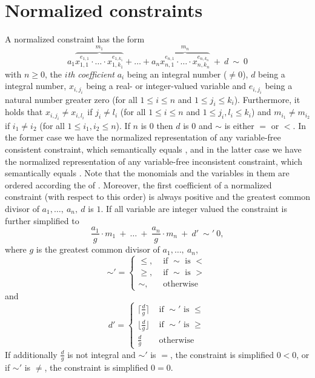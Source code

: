 \section{Normalized constraints}
A normalized constraint has the form
\[a_1\overbrace{x_{1,1}^{e_{1,1}}\cdot\ldots\cdot x_{1,k_1}^{e_{1,k_1}}}^{m_1}+\ldots+a_n\overbrace{x_{n,1}^{e_{n,1}}\cdot\ldots\cdot x_{n,k_n}^{e_{n,k_n}}}^{m_n}\ + \ d\ \sim \ 0\]
with $n\geq0$, the \emph{$i$th coefficient} $a_i$ being an integral number ($\neq 0$), $d$ being a integral number, $x_{i,j_i}$ being a real- or integer-valued variable and $e_{i,j_i}$ being a natural number greater zero (for all $1\leq i\leq n$ and $1\leq j_i\leq k_i$). Furthermore, it holds that
$x_{i,j_i}\neq x_{i,l_i}$ if $j_i\neq l_i$ (for all $1\leq i\leq n$ and $1\leq j_i, l_i\leq k_i$) and $m_{i_1}\neq m_{i_2}$ if $i_1\neq i_2$ (for all $1\leq i_1,i_2\leq n$). If $n$ is $0$ then $d$ is $0$ and $\sim$ is either $=$ or $<$. In the former case we have the normalized representation of any variable-free consistent constraint, which semantically equals \true, and in the latter case we have the normalized representation of any variable-free inconsistent constraint, which semantically equals \false. Note that the monomials and the variables in them are ordered according the \polynomialOrder of \carl.
Moreover, the first coefficient of a normalized constraint (with respect to this order) is always positive and the greatest common divisor of $a_1,\ldots,\ a_n,\ d$ is $1$. If all variable are integer valued the constraint is further simplified to
\[\frac{a_1}{g}\cdot m_1\ +\ \ldots\ +\ \frac{a_n}{g}\cdot m_n\ + \ d'\  \sim' \ 0,\]
where $g$ is the greatest common divisor of $a_1,\ldots,\ a_n$, 
\[\sim'=\left\{
\begin{array}{ll}
\leq, &\text{ if }\sim\text{ is }< \\
\geq, &\text{ if }\sim\text{ is }> \\
\sim, &\text{ otherwise }
\end{array}
\right.\]
and
\[
d' = \left\{
\begin{array}{ll}
\lceil\frac{d}{g}\rceil &\text{ if }\sim'\text{ is }\leq \\[1.5ex]
\lfloor\frac{d}{g}\rfloor &\text{ if }\sim'\text{ is }\geq \\[1.5ex]
\frac{d}{g} &\text{ otherwise }
\end{array}
\right.\]
If additionally $\frac{d}{g}$ is not integral and $\sim'$ is $=$, the constraint is simplified $0<0$, or if $\sim'$ is $\neq$,
the constraint is simplified $0=0$.

